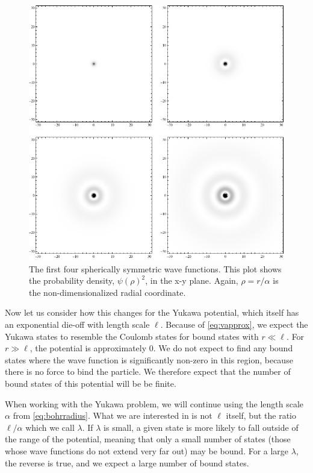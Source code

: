\documentclass[12pt,twoside]{reedthesis}
\begin{document}
\begin{figure}[h]
\centering
\includegraphics[scale=0.55]{Figures/densityplots}
\caption[Density plots of the first four spherically symmetric Coulomb wave functions]{The first four spherically symmetric wave functions. This plot shows the probability density, $\psi(\rho)^2$, in the x-y plane. Again, $\rho = r/\alpha$ is the non-dimensionalized radial coordinate.}
\label{fig:boundstates}
\end{figure}

Now let us consider how this changes for the Yukawa potential, which itself has an exponential die-off with length scale $\ell$. Because of \eqref{eq:vapprox}, we expect the Yukawa states to resemble the Coulomb states for bound states with $r \ll \ell$. For $r \gg \ell$, the potential is approximately $0$. We do not expect to find any bound states where the wave function is significantly non-zero in this region, because there is no force to bind the particle. We therefore expect that the number of bound states of this potential will be be finite.

When working with the Yukawa problem, we will continue using the length scale $\alpha$ from \eqref{eq:bohrradius}. What we are interested in is not $\ell$ itself, but the ratio $\ell / \alpha$ which we call $\lambda$.
If $\lambda$ is small, a given state is more likely to fall outside of the range of the potential, meaning that only a small number of states (those whose wave functions do not extend very far out) may be bound. For a large $\lambda$, the reverse is true, and we expect a large number of bound states.
\end{document}
